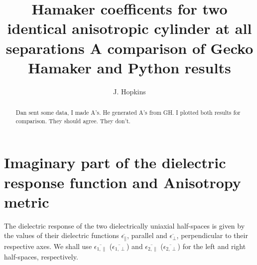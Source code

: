 \documentclass[onecolumn,letterpaper,amsmath,amssymb,floatfix,aps,superscriptaddress]{revtex4}
\begin{document}
\title{\bf Hamaker coefficents for two identical anisotropic cylinder at all separations
A comparison of Gecko Hamaker and Python results} 

\author{J. Hopkins}
    
\begin{abstract}
Dan sent some data, I made A's. He generated A's from GH. I plotted both results for comparison. They should agree. They don't.
\end{abstract}


\maketitle        

\section{Imaginary part of the dielectric response function and Anisotropy metric}
The dielectric response of the two dielectrically uniaxial half-spaces is given by the values of their dielectric functions $\overline{\epsilon_{\parallel}}$, parallel and 
$\overline{\epsilon_{\perp}}$, perpendicular to their respective axes.  We shall use $\overline{\epsilon_{1,\parallel}}$ ($\overline{\epsilon_{1,\perp}}$) and 
$\overline{\epsilon_{2,\parallel}}$ ($\overline{\epsilon_{2,\perp}}$) for the left and right half-spaces, respectively. 
\end{document}
